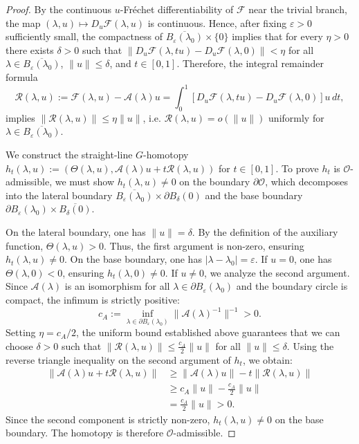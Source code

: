 \documentclass[twoside,11pt]{article}
\begin{document}
\begin{proof}
By the continuous $u$-Fréchet differentiability of $\mathscr F$ near the trivial branch, the map
$(\lambda,u)\longmapsto D_u\mathscr F(\lambda,u)$ is continuous. Hence, after fixing $\varepsilon>0$ sufficiently small, the compactness of $\overline{B_\varepsilon(\lambda_0)}\times\{0\}$ implies that for every $\eta>0$ there exists $\delta>0$ such that $\|D_u\mathscr F(\lambda,tu)-D_u\mathscr F(\lambda,0)\|<\eta$
for all $\lambda\in\overline{B_\varepsilon(\lambda_0)}$, $\|u\|\leq\delta$, and $t\in[0,1]$. Therefore, the integral remainder formula
\[
\mathscr R(\lambda,u)
:=\mathscr F(\lambda,u)-\mathscr A(\lambda)u
=
\int_0^1
\left[D_u\mathscr F(\lambda,tu)-D_u\mathscr F(\lambda,0)\right]u\,dt,
\]
implies $\|\mathscr R(\lambda,u)\|\leq \eta\|u\|$, i.e. $\mathscr R(\lambda,u)=o(\|u\|)$ uniformly for $\lambda\in\overline{B_\varepsilon(\lambda_0)}$.

We construct the straight-line $G$-homotopy $h_t(\lambda, u) := (\Theta(\lambda, u), \mathscr{A}(\lambda)u + t\mathscr{R}(\lambda,u))$ for $t \in [0,1]$. To prove $h_t$ is $\mathscr{O}$-admissible, we must show $h_t(\lambda,u) \neq 0$ on the boundary $\partial\mathscr{O}$, which decomposes into the lateral boundary $\overline{B_\varepsilon(\lambda_0)} \times \partial B_\delta(0)$ and the base boundary $\partial B_\varepsilon(\lambda_0) \times \overline{B_\delta(0)}$.

On the lateral boundary, one has $\|u\| = \delta$. By the definition of the auxiliary function, $\Theta(\lambda, u) > 0$. Thus, the first argument is non-zero, ensuring $h_t(\lambda, u) \neq 0$. On the base boundary, one has $|\lambda - \lambda_0| = \varepsilon$. If $u=0$, one has $\Theta(\lambda, 0) < 0$, ensuring $h_t(\lambda, 0) \neq 0$. If $u \neq 0$, we analyze the second argument. Since $\mathscr{A}(\lambda)$ is an isomorphism for all $\lambda \in \partial B_\varepsilon(\lambda_0)$ and the boundary circle is compact, the infimum is strictly positive:
\[
c_A := \inf_{\lambda \in \partial B_\varepsilon(\lambda_0)} \|\mathscr{A}(\lambda)^{-1}\|^{-1} > 0.
\]
Setting $\eta = c_A / 2$, the uniform bound established above guarantees that we can choose $\delta > 0$ such that $\|\mathscr{R}(\lambda,u)\| \le \frac{c_A}{2}\|u\|$ for all $\|u\| \le \delta$. Using the reverse triangle inequality on the second argument of $h_t$, we obtain:
\begin{align*}
    \|\mathscr{A}(\lambda)u + t\mathscr{R}(\lambda,u)\| &\ge \|\mathscr{A}(\lambda)u\| - t\|\mathscr{R}(\lambda, u)\| \\
    &\ge c_A\|u\| - \frac{c_A}{2}\|u\| \\
    &= \frac{c_A}{2}\|u\| > 0.
\end{align*}
Since the second component is strictly non-zero, $h_t(\lambda, u) \neq 0$ on the base boundary. The homotopy is therefore $\mathscr{O}$-admissible.
\end{proof}
\end{document}
